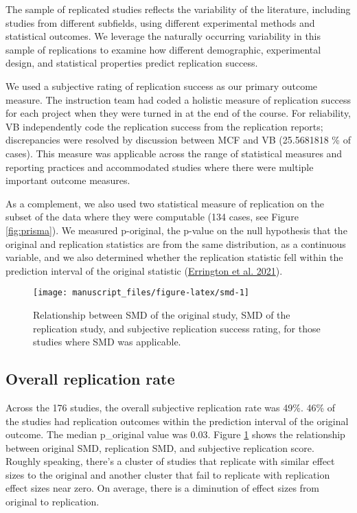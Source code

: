 \documentclass[
  english,
  a4paper,
]{article}
\begin{document}
The sample of replicated studies reflects the variability of the literature, including studies from different subfields, using different experimental methods and statistical outcomes. We leverage the naturally occurring variability in this sample of replications to examine how different demographic, experimental design, and statistical properties predict replication success.

We used a subjective rating of replication success as our primary outcome measure. The instruction team had coded a holistic measure of replication success for each project when they were turned in at the end of the course. For reliability, VB independently code the replication success from the replication reports; discrepancies were resolved by discussion between MCF and VB (25.5681818 \% of cases). This measure was applicable across the range of statistical measures and reporting practices and accommodated studies where there were multiple important outcome measures.

As a complement, we also used two statistical measure of replication on the subset of the data where they were computable (134 cases, see Figure \ref{fig:prisma}). We measured p-original, the p-value on the null hypothesis that the original and replication statistics are from the same distribution, as a continuous variable, and we also determined whether the replication statistic fell within the prediction interval of the original statistic (\protect\hyperlink{ref-errington2021}{Errington et al. 2021}).

\begin{figure}[ht]
\texttt{[image: manuscript\_files/figure-latex/smd-1]} \caption{Relationship between SMD of the original study, SMD of the replication study, and subjective replication success rating, for those studies where SMD was applicable.}\label{fig:smd}
\end{figure}

\hypertarget{overall-replication-rate}{%
\subsection{Overall replication rate}\label{overall-replication-rate}}

Across the 176 studies, the overall subjective replication rate was 49\%. 46\% of the studies had replication outcomes within the prediction interval of the original outcome. The median p\_original value was 0.03. Figure \ref{fig:smd} shows the relationship between original SMD, replication SMD, and subjective replication score. Roughly speaking, there's a cluster of studies that replicate with similar effect sizes to the original and another cluster that fail to replicate with replication effect sizes near zero. On average, there is a diminution of effect sizes from original to replication.
\end{document}

